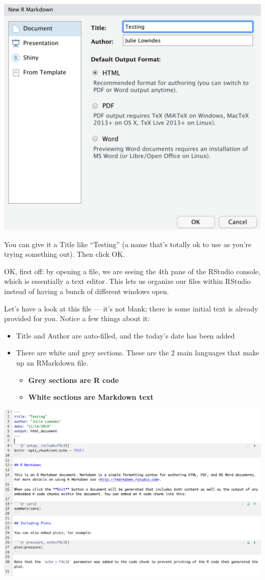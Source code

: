 \documentclass[]{book}
\providecommand{\tightlist}{%
  \setlength{\itemsep}{0pt}\setlength{\parskip}{0pt}}
\begin{document}
\includegraphics[width=0.8\linewidth]{img/rstudio_new-rmd-doc-html}

You can give it a Title like ``Testing'' (a name that's totally ok to use as you're trying something out). Then click OK.

OK, first off: by opening a file, we are seeing the 4th pane of the RStudio console, which is essentially a text editor. This lets us organize our files within RStudio instead of having a bunch of different windows open.

Let's have a look at this file --- it's not blank; there is some initial text is already provided for you. Notice a few things about it:

\begin{itemize}
\tightlist
\item
  Title and Author are auto-filled, and the today's date has been added
\item
  There are white and grey sections. These are the 2 main languages that make up an RMarkdown file.

  \begin{itemize}
  \tightlist
  \item
    \textbf{Grey sections are R code}
  \item
    \textbf{White sections are Markdown text}
  \end{itemize}
\end{itemize}

\includegraphics[width=0.8\linewidth]{img/rmarkdown}
\end{document}
